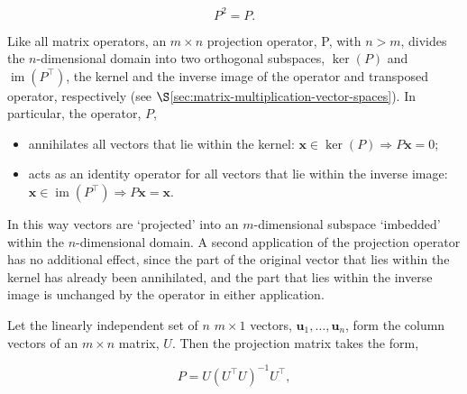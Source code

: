 \documentclass[12pt, twoside, draft]{article}
\begin{document}
\begin{equation}\label{eq:idempotent_operator}
P^2 = P.
\end{equation}

Like all matrix operators, an $m \times n$ projection operator, P, with $n > m$, divides the $n$-dimensional domain into two orthogonal subspaces, $\ker(P)$ and $\operatorname{im}(P^\top)$, the kernel and the inverse image of the operator and transposed operator, respectively (see $\S$\ref{sec:matrix-multiplication-vector-spaces}).  In particular, the operator, $P$, 
\begin{itemize}[noitemsep]
\item annihilates all vectors that lie within the kernel: $\mathbf{x} \in \ker(P) \Rightarrow P\mathbf{x} = 0$;
\item acts as an identity operator for all vectors that lie within the inverse image: $\mathbf{x} \in \operatorname{im}(P^\top) \Rightarrow P\mathbf{x} = \mathbf{x}$.
\end{itemize}

In this way vectors are `projected' into an $m$-dimensional subspace `imbedded' within the $n$-dimensional domain.  A second application of the projection operator has no additional effect, since the part of the original vector that lies within the kernel has already been annihilated, and the part that lies within the inverse image is unchanged by the operator in either application.

Let the linearly independent set of $n$ $m \times 1$ vectors, $\mathbf{u}_1, \ldots, \mathbf{u}_n$, form the column vectors of an $m \times n$ matrix, $U$. Then the projection matrix takes the form,

\begin{equation}\label{eq:projection_matrix}
P = U(U^\top U)^{-1} U^\top,
\end{equation}
\end{document}

